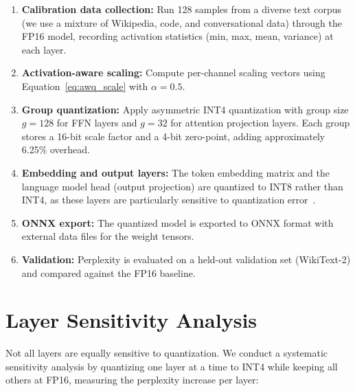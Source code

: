 \documentclass[12pt, letterpaper, twoside]{report}
\begin{document}
\begin{enumerate}[itemsep=3pt]
\item \textbf{Calibration data collection:} Run 128 samples from a diverse text corpus (we use a mixture of Wikipedia, code, and conversational data) through the FP16 model, recording activation statistics (min, max, mean, variance) at each layer.

\item \textbf{Activation-aware scaling:} Compute per-channel scaling vectors using Equation~\ref{eq:awq_scale} with $\alpha = 0.5$.

\item \textbf{Group quantization:} Apply asymmetric INT4 quantization with group size $g = 128$ for FFN layers and $g = 32$ for attention projection layers. Each group stores a 16-bit scale factor and a 4-bit zero-point, adding approximately 6.25\% overhead.

\item \textbf{Embedding and output layers:} The token embedding matrix and the language model head (output projection) are quantized to INT8 rather than INT4, as these layers are particularly sensitive to quantization error~\cite{bondarenko2024quantizable}.

\item \textbf{ONNX export:} The quantized model is exported to ONNX format with external data files for the weight tensors.

\item \textbf{Validation:} Perplexity is evaluated on a held-out validation set (WikiText-2) and compared against the FP16 baseline.
\end{enumerate}

\section{Layer Sensitivity Analysis}
\label{sec:layer_sensitivity}

Not all layers are equally sensitive to quantization. We conduct a systematic sensitivity analysis by quantizing one layer at a time to INT4 while keeping all others at FP16, measuring the perplexity increase per layer:
\end{document}

